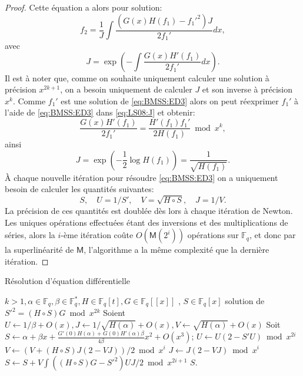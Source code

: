 \documentclass[10pt,a4paper]{book}
\theoremstyle{plain}
\theoremstyle{definition}
\theoremstyle{definition}
\theoremstyle{definition}
\theoremstyle{definition}
\theoremstyle{definition}
\theoremstyle{remark}
\theoremstyle{remark}
\theoremstyle{definition}
\begin{document}
\begin{proof}
 Cette équation a alors pour solution:
\begin{equation}
f_2=\frac{1}{J}\int \frac{(G(x)H(f_1)-f_1'^2)J}{2f_1'} dx,
\end{equation}
avec 
\begin{equation}
\label{eq:LS08:J}
J=\exp \left( -\int \frac{G(x)H'(f_1)}{2f_1'}dx \right).
\end{equation}
Il est à noter que, comme on souhaite uniquement calculer une solution à précision $x^{2k+1}$, on a besoin uniquement de calculer $J$ et son inverse à précision $x^k$.
Comme $f_1'$ est une solution de \eqref{eq:BMSS:ED3} alors on peut réexprimer $f_1'$ à l'aide de \eqref{eq:BMSS:ED3} dans \eqref{eq:LS08:J} et obtenir:
\begin{equation}
\frac{G(x)H'(f_1)}{2f_1'}=\frac{H'(f_1)f_1'}{2H(f_1)} \bmod x^k,
\end{equation}
ainsi 
\begin{equation}
J=\exp \left(-\frac{1}{2}\log H(f_1) \right)= \frac{1}{\sqrt{H(f_1)}}.
\end{equation}
\`A chaque nouvelle itération pour résoudre \eqref{eq:BMSS:ED3} on a uniquement besoin de calculer les quantités suivantes:
\begin{equation}
S, \quad U=1/S', \quad V=\sqrt{H \circ S}, \quad J=1/V.
\end{equation}
La précision de ces quantités est doublée dès lors à chaque itération de 
Newton. Les uniques opérations effectuées étant des inversions et des 
multiplications de séries, alors la $i$-ème itération coûte 
$O(\mathsf{M}(2^i))$ opérations sur $\mathbb{F}_q$, et donc par la superlinéarité
de $\mathsf{M}$, l'algorithme a la même complexité que la dernière itération. 
\end{proof}


\begin{algorithm}
\caption{\label{alg:BMSS:eqdiff} Résolution d'équation différentielle}
\begin{algorithmic}[1]
\REQUIRE $k>1, \alpha \in \mathbb{F}_q, \beta \in \mathbb{F}_q^*, H \in \mathbb{F}_q[t], G \in \mathbb{F}_{q}[[x]]$ ,%
\ENSURE $S \in \mathbb{F}_q[x]$ solution de $S'^2=(H \circ S)G \bmod x^{2k}$
\STATE Soient $U \gets 1/\beta + O(x), J \gets 1/\sqrt{H(\alpha)}+O(x), V \gets \sqrt{H(\alpha)} + O(x)$
\STATE Soit $S \gets \alpha + \beta x + \frac{G'(0)H(\alpha)+G(0)H'(\alpha)\beta}{4\beta}x^2+O(x^3)$;
\STATE $U \gets U(2-S'U) \bmod x^{2i}$
\STATE $V \gets (V+(H \circ S)J(2-VJ))/2 \bmod x^{i}$
\STATE $J \gets J(2-VJ) \bmod {x^i}$
\STATE \label{alg:BMSS:eqdiff:int} $S \gets S+V \int ((H \circ S)G-S'^2)UJ/2 \bmod x^{2i+1}$
\ENDFOR
\RETURN$S$. 
\end{algorithmic}
\end{algorithm}
\end{document}
